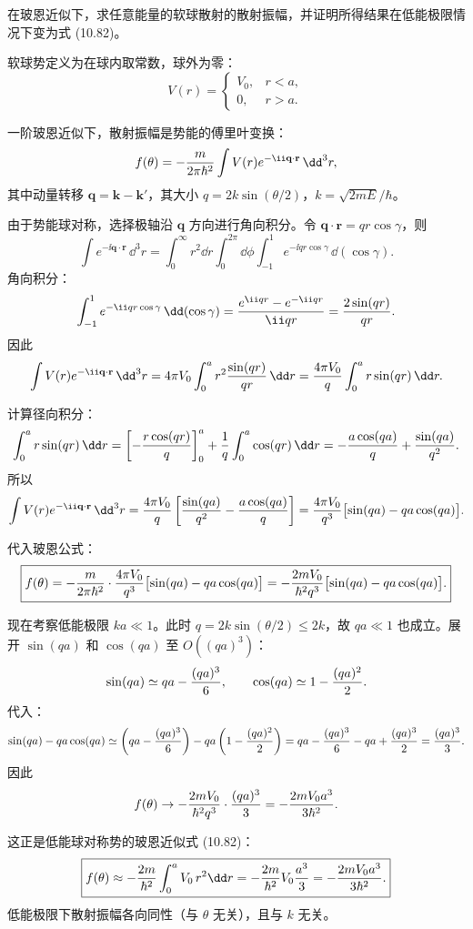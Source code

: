 \begin{question}
在玻恩近似下，求任意能量的软球散射的散射振幅，并证明所得结果在低能极限情况下变为式 (10.82)。

\par\smallskip
{}

\end{question}
\begin{solution}
软球势定义为在球内取常数，球外为零：
\[
V(r)=\begin{cases}
V_0,& r<a,\\
0,& r>a.
\end{cases}
\]

一阶玻恩近似下，散射振幅是势能的傅里叶变换：
\[
f(\theta)=-{m\over2\pi\hbar^2}\int V(r)e^{-\ii\mathbf q\cdot\mathbf r}\,\dd^3r,
\]
其中动量转移 $\mathbf q=\mathbf k-\mathbf k'$，其大小 $q=2k\sin(\theta/2)$，$k=\sqrt{2mE}/\hbar$。

由于势能球对称，选择极轴沿 $\mathbf q$ 方向进行角向积分。令 $\mathbf q\cdot\mathbf r=qr\cos\gamma$，则
\[
\int e^{-\ii\mathbf q\cdot\mathbf r}\,\dd^3r
=\int_0^\infty r^2\dd r\int_0^{2\pi}\dd\phi\int_{-1}^{1}e^{-\ii qr\cos\gamma}\,\dd(\cos\gamma).
\]
角向积分：
\[
\int_{-1}^{1}e^{-\ii qr\cos\gamma}\,\dd(\cos\gamma)
={e^{\ii qr}-e^{-\ii qr}\over\ii qr}={2\sin(qr)\over qr}.
\]
因此
\[
\int V(r)e^{-\ii\mathbf q\cdot\mathbf r}\,\dd^3r
=4\pi V_0\int_0^a r^2{\sin(qr)\over qr}\,\dd r
={4\pi V_0\over q}\int_0^a r\sin(qr)\,\dd r.
\]

计算径向积分：
\[
\int_0^a r\sin(qr)\,\dd r
=\left[-{r\cos(qr)\over q}\right]_0^a+{1\over q}\int_0^a\cos(qr)\,\dd r
=-{a\cos(qa)\over q}+{\sin(qa)\over q^2}.
\]
所以
\[
\int V(r)e^{-\ii\mathbf q\cdot\mathbf r}\,\dd^3r
={4\pi V_0\over q}\left[{\sin(qa)\over q^2}-{a\cos(qa)\over q}\right]
={4\pi V_0\over q^3}\bigl[\sin(qa)-qa\cos(qa)\bigr].
\]

代入玻恩公式：
\[
\boxed{f(\theta)=-{m\over2\pi\hbar^2}\cdot{4\pi V_0\over q^3}\bigl[\sin(qa)-qa\cos(qa)\bigr]
=-{2mV_0\over\hbar^2q^3}\bigl[\sin(qa)-qa\cos(qa)\bigr].}
\]

现在考察低能极限 $ka\ll1$。此时 $q=2k\sin(\theta/2)\le2k$，故 $qa\ll1$ 也成立。展开 $\sin(qa)$ 和 $\cos(qa)$ 至 $O((qa)^3)$：
\[
\sin(qa)\simeq qa-{(qa)^3\over6},\qquad
\cos(qa)\simeq1-{(qa)^2\over2}.
\]
代入：
\[
\sin(qa)-qa\cos(qa)
\simeq\left(qa-{(qa)^3\over6}\right)-qa\left(1-{(qa)^2\over2}\right)
=qa-{(qa)^3\over6}-qa+{(qa)^3\over2}
={(qa)^3\over3}.
\]
因此
\[
f(\theta)\to-{2mV_0\over\hbar^2q^3}\cdot{(qa)^3\over3}
=-{2mV_0a^3\over3\hbar^2}.
\]

这正是低能球对称势的玻恩近似式 (10.82)：
\[
\boxed{f(\theta)\approx-{2m\over\hbar^2}\int_0^a V_0\,r^2\dd r
=-{2m\over\hbar^2}V_0{a^3\over3}
=-{2mV_0a^3\over3\hbar^2}.}
\]
低能极限下散射振幅各向同性（与 $\theta$ 无关），且与 $k$ 无关。
\end{solution}

